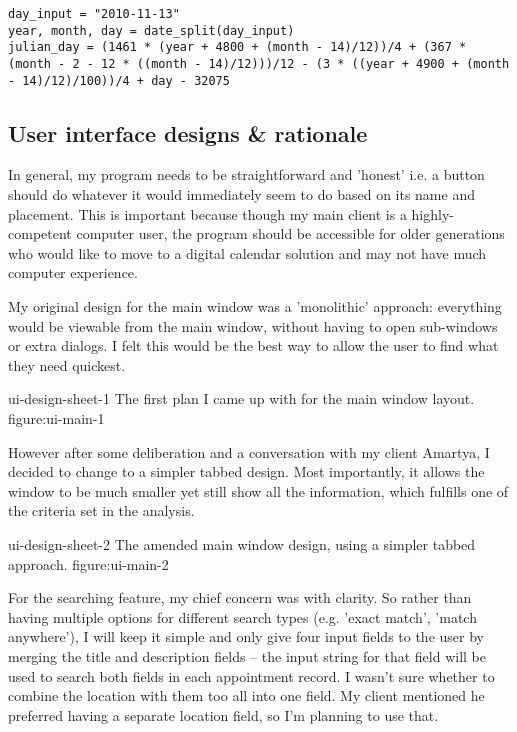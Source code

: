 \begin{verbatim}
day_input = "2010-11-13"
year, month, day = date_split(day_input)
julian_day = (1461 * (year + 4800 + (month - 14)/12))/4 + (367 * (month - 2 - 12 * ((month - 14)/12)))/12 - (3 * ((year + 4900 + (month - 14)/12)/100))/4 + day - 32075
\end{verbatim}


\subsection{User interface designs \& rationale}

In general, my program needs to be straightforward and 'honest' i.e. a button
should do whatever it would immediately seem to do based on its name and
placement. This is important because though my main client is a highly-competent
computer user, the program should be accessible for older generations who would
like to move to a digital calendar solution and may not have much computer
experience.

My original design for the main window was a 'monolithic' approach: everything
would be viewable from the main window, without having to open sub-windows or
extra dialogs. I felt this would be the best way to allow the user to find what
they need quickest.

\addfigure
    {ui-design-sheet-1}
    {The first plan I came up with for the main window layout.}
    {figure:ui-main-1}

However after some deliberation and a conversation with my client Amartya, I
decided to change to a simpler tabbed design. Most importantly, it allows the
window to be much smaller yet still show all the information, which fulfills one
of the criteria set in the analysis.

\addfigure
    {ui-design-sheet-2}
    {The amended main window design, using a simpler tabbed approach.}
    {figure:ui-main-2}

For the searching feature, my chief concern was with clarity. So rather than
having multiple options for different search types (e.g. 'exact match', 'match
anywhere'), I will keep it simple and only give four input fields to the user by
merging the title and description fields -- the input string for that field will
be used to search both fields in each appointment record. I wasn't sure whether
to combine the location with them too all into one field. My client mentioned he
preferred having a separate location field, so I'm planning to use that.

